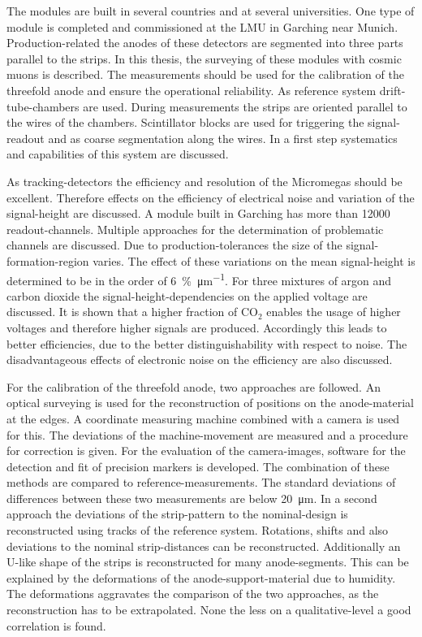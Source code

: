 \documentclass[
twoside,            %
BCOR1.4cm,          %
10pt,               %
headings=normal,    %
headsepline,        %
clearplainpage,		%
final,              %
div=14,
open=right,
bibliography=toc
]{scrreprt}
\begin{document}
The modules are built in several countries and at several universities.
One type of module is completed and commissioned at the LMU in Garching near Munich.
Production-related the anodes of these detectors are segmented into three parts parallel to the strips.
In this thesis, the surveying of these modules with cosmic muons is described.
The measurements should be used for the calibration of the threefold anode and ensure the operational reliability.
As reference system drift-tube-chambers are used.
During measurements the strips are oriented parallel to the wires of the chambers.
Scintillator blocks are used for triggering the signal-readout and as coarse segmentation along the wires.
In a first step systematics and capabilities of this system are discussed.

As tracking-detectors the efficiency and resolution of the Micromegas should be excellent.
Therefore effects on the efficiency of electrical noise and variation of the signal-height are discussed.
A module built in Garching has more than 12000 readout-channels.
Multiple approaches for the determination of problematic channels are discussed.
Due to production-tolerances the size of the signal-formation-region varies.
The effect of these variations on the mean signal-height is determined to be in the order of \SI{6}{\%\per\micro\m}.
For three mixtures of argon and carbon dioxide the signal-height-dependencies on the applied voltage are discussed.
It is shown that a higher fraction of CO$_2$ enables the usage of higher voltages and therefore higher signals are produced.
Accordingly this leads to better efficiencies, due to the better distinguishability with respect to noise.
The disadvantageous effects of electronic noise on the efficiency are also discussed.

For the calibration of the threefold anode, two approaches are followed.
An optical surveying is used for the reconstruction of positions on the anode-material at the edges.
A coordinate measuring machine combined with a camera is used for this.
The deviations of the machine-movement are measured and a procedure for correction is given.
For the evaluation of the camera-images, software for the detection and fit of precision markers is developed.
The combination of these methods are compared to reference-measurements.
The standard deviations of differences between these two measurements are below \SI{20}{\micro\m}.
In a second approach the deviations of the strip-pattern to the nominal-design is reconstructed using tracks of the reference system.
Rotations, shifts and also deviations to the nominal strip-distances can be reconstructed.
Additionally an U-like shape of the strips is reconstructed for many anode-segments.
This can be explained by the deformations of the anode-support-material due to humidity.
The deformations aggravates the comparison of the two approaches, as the reconstruction has to be extrapolated.
None the less on a qualitative-level a good correlation is found.
\end{document}
